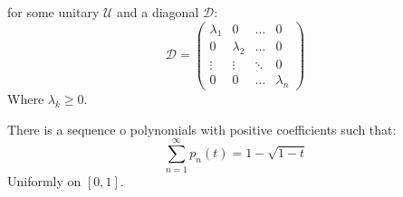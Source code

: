         for some unitary $\mathcal{U}$ and a diagonal
        $\mathcal{D}$:
        \begin{equation}
            \mathcal{D}=
                \begin{pmatrix}
                    \lambda_{1}&0&\dots&0\\
                    0&\lambda_{2}&\dots&0\\
                    \vdots&\vdots&\ddots&0\\
                    0&0&\dots&\lambda_{n}
                \end{pmatrix}
        \end{equation}
        Where $\lambda_{k}\geq{0}$.
        \begin{theorem}
            There is a sequence o polynomials with positive
            coefficients such that:
            \begin{equation}
                \sum_{n=1}^{\infty}p_{n}(t)=1-\sqrt{1-t}
            \end{equation}
            Uniformly on $[0,1]$.
        \end{theorem}

